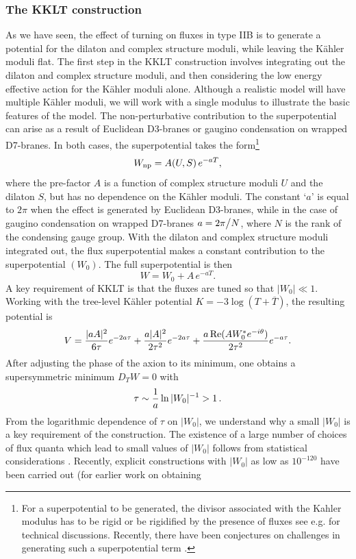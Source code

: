 \subsubsection{The KKLT construction}

As we have seen, the effect of turning on fluxes in type IIB is to generate a potential for the dilaton and complex structure moduli, while leaving the K\"ahler moduli flat. The first step in the KKLT construction involves integrating out the dilaton and complex structure moduli, and then considering the low energy effective action for the K\"ahler moduli alone.  Although a realistic model will have multiple K\"ahler moduli, we will work with a single modulus to illustrate the basic features of the model. The non-perturbative contribution to the superpotential can arise as a result of Euclidean D3-branes or gaugino condensation on wrapped D7-branes.
In both cases, the  superpotential takes the form\footnote{For a superpotential to be generated, the divisor associated with the Kahler modulus has to be
rigid or be rigidified by the presence of fluxes  see e.g. \cite{Witten:1996bn, Kallosh:2005yu, Kallosh:2005gs, Bianchi:2011qh, Blumenhagen:2009qh, Kim:2022uni,  Alexandrov:2022mmy, Kim:2022jvv, Kim:2023cbh} for technical discussions. Recently, there have been conjectures on challenges in generating such a superpotential term \cite{Lust:2022lfc}. }
$$ 
  W_{\rm np} = A(U, S) \,e^{ -a T},
$$
where the pre-factor $A$ is a function of complex structure moduli $U$ and the dilaton $S$, but has no dependence on the K\"ahler moduli. 
The constant `$a$' is equal to $2 \pi$ when the effect is generated by Euclidean D3-branes, while in the case of gaugino condensation on wrapped D7-branes  $a = 2 \pi \big{/} N$, where $N$ is the rank of the condensing gauge group. With the dilaton and complex structure moduli integrated out, the flux superpotential makes a constant contribution to the superpotential $(W_0)$. The full superpotential is then
$$
W = W_0 + A\,e^{-aT}.
$$
A key requirement of KKLT is that the fluxes are tuned so that $|W_0| \ll 1$. Working with the tree-level K\"ahler potential $K = - 3 \log \left( T + \overline{T} \right)$, the resulting potential is 
$$
 V = { |a A|^{2} \over 6 \tau}  e^{-2a \tau} + {a |A|^2 \over 2 \tau^{2} } e^{-2a\tau} + {{a \,{\rm{Re}}(A W_0^{*} e^{-i \theta})} \over 2 \tau^{2} } e^{-a\tau}.
 $$
After adjusting the phase of the axion to its minimum, one obtains a supersymmetric minimum $D_TW=0$ with 
$$
   \tau \sim { 1\over  a}   \ln  { |W_0|^{-1}  } > 1\,.
$$
From the logarithmic dependence of $\tau$ on $|W_0|$, we understand why a small $|W_0|$ is a key requirement of the construction. The existence of a large number of choices of flux quanta which lead to small values of $|W_0|$ follows from statistical considerations \cite{Denef:2004ze}. Recently, explicit constructions with $|W_0|$ as low as $10^{-120}$ have been carried out  \cite{Demirtas:2019sip,Demirtas:2021nlu} (for earlier work on obtaining 
